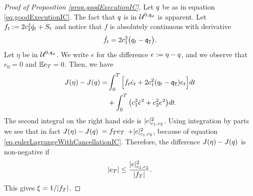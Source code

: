 \documentclass[10pt,a4paper]{article}
\begin{document}
	\begin{proof}[Proof of Proposition \ref{prop.goodExecutionIC}]
		Let $q$ be as in equation  \eqref{eq.goodExecutionIC}. The fact that $q$ is in $\mathcal{U}^{0,\mathfrak{q_0}}$ is apparent. Let $f_t:= 2c_{1}^{2} \dot{q}_{t} + S_t$ and notice that $f$ is absolutely continuous with derivative 
		\begin{equation}\label{eq.eulerLagrangeWithCancellationIC}
		\dot{f}_t = 2 c_{1}^{2} \big(q_t - \mathfrak{q}_{\mathtt{T} }\big).
		\end{equation}
		Let $\eta$ be in $\mathcal{U}^{0,\mathfrak{q_0}}$. We write $e$ for the difference $e:=\eta-q$, and we observe that $e_0=0$ and $\mathbb{{E}} e_T = 0$.  Then, we have 
		\begin{equation*}
		\begin{split}
		J(\eta) - J(q) = &
		\int_{0}^{T} \Big[ f_t \dot{e}_t + 2c_{1}^{2} (q_t - \mathfrak{q}_{\mathtt{T} })e_t\Big]dt\\
		&+\int_{0}^{T}\big(c_{1}^{2} \dot{e}^{2} + c_{2}^{2} e^{2} \big)dt.
		\end{split}
		\end{equation*}
		The second integral on the right hand side is $ \lvert e \rvert_{c_{1},c_{2}}^{2}$.  
		Using integration by parts we see that in fact $J(\eta) - J(q) $ $= f_T e_T $ $ + \lvert e \rvert_{c_{1},c_{2}}^{2}$, because of equation \eqref{eq.eulerLagrangeWithCancellationIC}.  
		Therefore, the difference $J(\eta) - J(q) $ is non-negative if 
		\begin{equation*}
		\left\lvert {e_T} \right\rvert
		\leq \frac{ \lvert e \rvert_{c_{1},c_{2}}^{2}}{\left\lvert {f_T} \right\rvert}.
		\end{equation*}
		This gives $\xi = 1/\lvert f_T\rvert$.
		

\end{proof}
\end{document}
